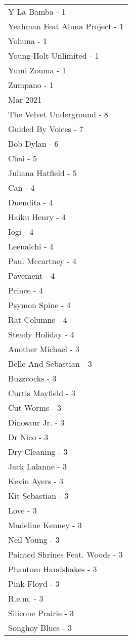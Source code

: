 \documentclass[
]{article}
\begin{document}
\begin{longtable}{l}
Y La Bamba - 1 \\ 
Yeahman Feat Aluna Project - 1 \\ 
Yohuna - 1 \\ 
Young-Holt Unlimited - 1 \\ 
Yumi Zouma - 1 \\ 
Zumpano - 1 \\ 
\midrule
\multicolumn{1}{l}{Mar 2021} \\ 
\midrule
The Velvet Underground - 8 \\ 
Guided By Voices - 7 \\ 
Bob Dylan - 6 \\ 
Chai - 5 \\ 
Juliana Hatfield - 5 \\ 
Can - 4 \\ 
Duendita - 4 \\ 
Haiku Henry - 4 \\ 
Iogi - 4 \\ 
Leenalchi - 4 \\ 
Paul Mccartney - 4 \\ 
Pavement - 4 \\ 
Prince - 4 \\ 
Psymon Spine - 4 \\ 
Rat Columns - 4 \\ 
Steady Holiday - 4 \\ 
Another Michael - 3 \\ 
Belle And Sebastian - 3 \\ 
Buzzcocks - 3 \\ 
Curtis Mayfield - 3 \\ 
Cut Worms - 3 \\ 
Dinosaur Jr. - 3 \\ 
Dr Nico - 3 \\ 
Dry Cleaning - 3 \\ 
Jack Lalanne - 3 \\ 
Kevin Ayers - 3 \\ 
Kit Sebastian - 3 \\ 
Love - 3 \\ 
Madeline Kenney - 3 \\ 
Neil Young - 3 \\ 
Painted Shrines Feat. Woods - 3 \\ 
Phantom Handshakes - 3 \\ 
Pink Floyd - 3 \\ 
R.e.m. - 3 \\ 
Silicone Prairie - 3 \\ 
Songhoy Blues - 3 \\ 

\end{longtable}
\end{document}
